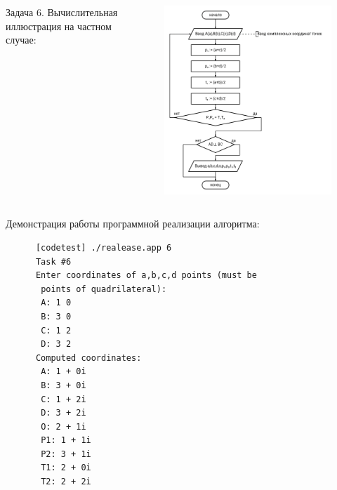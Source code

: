 \documentclass{beamer}
\begin{document}
\begin{frame}
   \begin{columns}
      \begin{column}{0.3\textwidth}
         \begin{block}{Задача 6. Вычислительная иллюстрация на частном случае:}
         \end{block}
      \end{column}
      \begin{column}{0.6\textwidth}
         \begin{figure}[h]
            \includegraphics[width=1\textwidth]{images/task6-diagram.png}
         \end{figure}
      \end{column}
   \end{columns}
\end{frame}

\begin{frame}[fragile]
   Демонстрация работы программной реализации алгоритма:
   \begin{verbatim}
      [codetest] ./realease.app 6
      Task #6
      Enter coordinates of a,b,c,d points (must be 
       points of quadrilateral):
       A: 1 0
       B: 3 0
       C: 1 2
       D: 3 2
      Computed coordinates:
       A: 1 + 0i
       B: 3 + 0i
       C: 1 + 2i
       D: 3 + 2i
       O: 2 + 1i
       P1: 1 + 1i
       P2: 3 + 1i
       T1: 2 + 0i
       T2: 2 + 2i
   \end{verbatim}
\end{frame}
\end{document}
